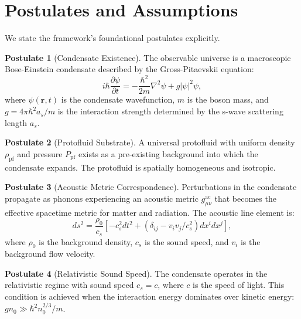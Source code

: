 \documentclass[11pt,a4paper]{article}
\theoremstyle{definition}
\newtheorem{postulate}{Postulate}
\theoremstyle{remark}
\begin{document}
\section{Postulates and Assumptions}
\label{sec:postulates}

We state the framework's foundational postulates explicitly.

\begin{postulate}[Condensate Existence]
\label{post:condensate}
The observable universe is a macroscopic Bose-Einstein condensate described by the Gross-Pitaevskii equation:
\begin{equation}
i\hbar \frac{\partial\psi}{\partial t} = -\frac{\hbar^2}{2m}\nabla^2\psi + g|\psi|^2\psi,
\end{equation}
where $\psi(\mathbf{r},t)$ is the condensate wavefunction, $m$ is the boson mass, and $g = 4\pi\hbar^2 a_s/m$ is the interaction strength determined by the s-wave scattering length $a_s$.
\end{postulate}

\begin{postulate}[Protofluid Substrate]
\label{post:protofluid}
A universal protofluid with uniform density $\rho_{\mathrm{pf}}$ and pressure $P_{\mathrm{pf}}$ exists as a pre-existing background into which the condensate expands. The protofluid is spatially homogeneous and isotropic.
\end{postulate}

\begin{postulate}[Acoustic Metric Correspondence]
\label{post:acoustic_metric}
Perturbations in the condensate propagate as phonons experiencing an acoustic metric $g_{\mu\nu}^{\mathrm{ac}}$ that becomes the effective spacetime metric for matter and radiation. The acoustic line element is:
\begin{equation}
ds^2 = \frac{\rho_0}{c_s}\left[-c_s^2 dt^2 + (\delta_{ij} - v_i v_j/c_s^2)dx^i dx^j\right],
\end{equation}
where $\rho_0$ is the background density, $c_s$ is the sound speed, and $v_i$ is the background flow velocity.
\end{postulate}

\begin{postulate}[Relativistic Sound Speed]
\label{post:relativistic}
The condensate operates in the relativistic regime with sound speed $c_s = c$, where $c$ is the speed of light. This condition is achieved when the interaction energy dominates over kinetic energy: $g n_0 \gg \hbar^2 n_0^{2/3}/m$.
\end{postulate}
\end{document}
